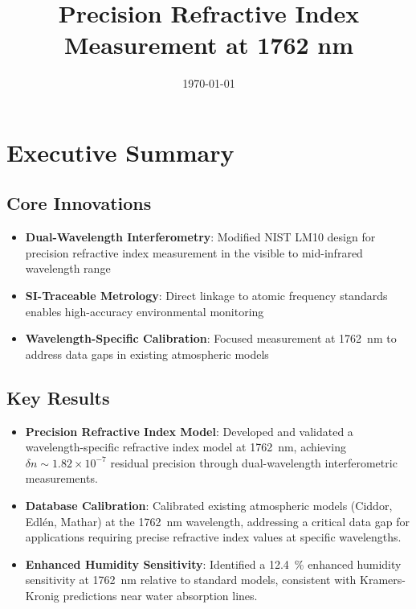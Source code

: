 \documentclass[aip,reprint,groupedaddress,onecolumn,superscriptaddress]{revtex4-2}
\begin{document}
\title{Precision Refractive Index Measurement at 1762 nm}
\date{\today}

\maketitle

\section{Executive Summary}

\subsection{Core Innovations}
\begin{itemize}
    \item \textbf{Dual-Wavelength Interferometry}: Modified NIST LM10 \cite{fox1999reliable} design for precision refractive index measurement in the visible to mid-infrared wavelength range
    \item \textbf{SI-Traceable Metrology}: Direct linkage to atomic frequency standards enables high-accuracy environmental monitoring
    \item \textbf{Wavelength-Specific Calibration}: Focused measurement at \SI{1762}{\nano\meter} to address data gaps in existing atmospheric models
\end{itemize}

\subsection{Key Results}
\begin{itemize}
    \item \textbf{Precision Refractive Index Model}: Developed and validated a wavelength-specific refractive index model at \SI{1762}{\nano\meter}, achieving $\delta n \sim 1.82\times10^{-7}$ residual precision through dual-wavelength interferometric measurements.
    \item \textbf{Database Calibration}: Calibrated existing atmospheric models (Ciddor\cite{ciddor1996refractive}, Edlén\cite{edlen1966refractive}, Mathar\cite{mathar2007refractive}) at the \SI{1762}{\nano\meter} wavelength, addressing a critical data gap for applications requiring precise refractive index values at specific wavelengths.
    \item \textbf{Enhanced Humidity Sensitivity}: Identified a \SI{12.4}{\percent} enhanced humidity sensitivity at \SI{1762}{\nano\meter} relative to standard models, consistent with Kramers-Kronig predictions\cite{perakis2016vibrational} near water absorption lines\cite{kochanov2016hitran}.
\end{itemize}
\end{document}
